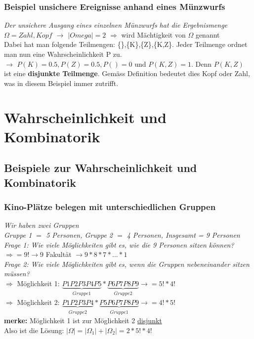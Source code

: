 \documentclass[a4paper]{article}
\theoremstyle{definition}
\theoremstyle{example}
\begin{document}
\subsubsection{Beispiel unsichere Ereignisse anhand eines Münzwurfs}
\textit{Der unsichere Ausgang eines einzelnen Münzwurfs hat die Ergebnismenge $\Omega ={Zahl,Kopf}$ $\rightarrow$ $|Omega|=2$} $\Rightarrow$ wird Mächtigkeit von $\Omega$ genannt\\
Dabei hat man folgende Teilmengen: \{\},\{K\},\{Z\},\{K,Z\}. Jeder Teilmenge ordnet man nun eine Wahrscheinlichkeit P zu.\\ $\rightarrow$ $P({K})=0.5, P({Z})=0.5, P({})= 0\textrm{ und }P({K,Z})=1$. Denn $P({K,Z})$ ist eine \textbf{disjunkte Teilmenge}. Gemäss Definition bedeutet dies Kopf oder Zahl, was in diesem Beispiel immer zutrifft.

\section{Wahrscheinlichkeit und Kombinatorik}

\subsection{Beispiele zur Wahrscheinlichkeit und Kombinatorik}
\subsubsection{Kino-Plätze belegen mit unterschiedlichen Gruppen}
\textit{Wir haben zwei Gruppen\\ Gruppe 1 $=$ 5 Personen, Gruppe 2 $=$ 4 Personen, Insgesamt = 9 Personen}\\
\textit{Frage 1: Wie viele Möglichkeiten gibt es, wie die 9 Personen sitzen können?}\\
$\Rightarrow = 9! \rightarrow 9$ Fakultät $\rightarrow 9*8*7*...*1$\\
\textit{Frage 2: Wie viele Möglichkeiten gibt es, wenn die Gruppen nebeneinander sitzen müssen?}\\
$\Rightarrow$ Möglichkeit 1: $\underbrace{P1 P2 P3 P4 P5}_{\substack{Gruppe 1}} * \underbrace{P6 P7 P8 P9}_{\substack{Gruppe 2}} \rightarrow = 5! * 4!$\\
$\Rightarrow$ Möglichkeit 2: $\underbrace{P1 P2 P3 P4}_{\substack{Gruppe 2}} * \underbrace{P5 P6 P7 P8 P9}_{\substack{Gruppe 1}} \rightarrow = 4! * 5!$\\
\textbf{merke: } Möglichkeit 1 ist zur Möglichkeit 2 \underline{disjunkt}\\
Also ist die Lösung: $|\Omega| = |\Omega_1| + |\Omega_2| = 2*5!*4!$
\end{document}
